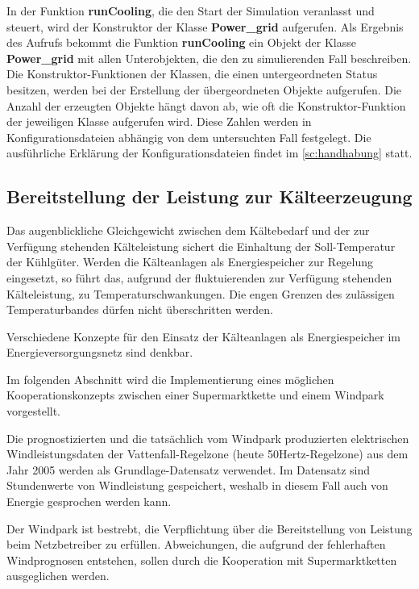In der Funktion \textbf{runCooling}, die den Start der Simulation veranlasst und
steuert, wird der Konstruktor der Klasse \textbf{Power\_grid} aufgerufen. Als
Ergebnis des Aufrufs bekommt die Funktion \textbf{runCooling} ein Objekt der
Klasse \textbf{Power\_grid} mit allen Unterobjekten, die den zu simulierenden
Fall beschreiben. Die Konstruktor-Funktionen der Klassen, die einen
untergeordneten Status besitzen, werden bei der Erstellung der \"ubergeordneten
Objekte aufgerufen. Die Anzahl der erzeugten Objekte h\"angt davon ab, wie oft
die Konstruktor-Funktion der jeweiligen Klasse aufgerufen wird. Diese Zahlen
werden in Konfigurationsdateien abh\"angig von dem untersuchten Fall festgelegt.
Die ausf\"uhrliche Erkl\"arung der Konfigurationsdateien findet im
\cref{sc:handhabung} statt.

\subsection*{Bereitstellung der Leistung zur K\"alteerzeugung}

Das augenblickliche Gleichgewicht zwischen dem K\"altebedarf und der zur
Verf\"ugung stehenden K\"alteleistung sichert die Einhaltung der Soll-Temperatur
der K\"uhlg\"uter. Werden die K\"alteanlagen als Energiespeicher zur Regelung
eingesetzt, so f\"uhrt das, aufgrund der fluktuierenden zur Verf\"ugung
stehenden K\"alteleistung, zu Temperaturschwankungen. Die engen Grenzen des
zul\"assigen Temperaturbandes d\"urfen nicht \"uberschritten werden.

Verschiedene Konzepte f\"ur den Einsatz der K\"alteanlagen als Energiespeicher
im Energieversorgungsnetz sind denkbar.

Im folgenden Abschnitt wird die Implementierung eines m\"oglichen
Kooperationskonzepts zwischen einer Supermarktkette und einem Windpark
vorgestellt.

Die prognostizierten und die tatsächlich vom Windpark produzierten elektrischen
Windleistungsdaten der Vattenfall-Regelzone (heute 50Hertz-Regelzone) aus dem
Jahr 2005 werden als Grundlage-Datensatz verwendet. Im Datensatz sind
Stundenwerte von Windleistung gespeichert, weshalb in diesem Fall auch von
Energie gesprochen werden kann.

Der Windpark ist bestrebt, die Verpflichtung \"uber die Bereitstellung von
Leistung beim Netzbetreiber zu erf\"ullen. Abweichungen, die aufgrund der
fehlerhaften Windprognosen entstehen, sollen durch die Kooperation mit
Supermarktketten ausgeglichen werden.

